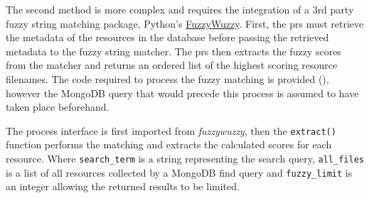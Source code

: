 The second method is more complex and requires the integration of a 3rd party fuzzy string matching package, Python's \href{https://pypi.org/project/fuzzywuzzy/}{FuzzyWuzzy}. First, the \acrshort{prs} must retrieve the metadata of the resources in the database before passing the retrieved metadata to the fuzzy string matcher. The \acrshort{prs} then extracts the fuzzy scores from the matcher and returns an ordered list of the highest scoring resource filenames. The code required to process the fuzzy matching is provided (), however the MongoDB query that would precede this process is assumed to have taken place beforehand.

The process interface is first imported from \textit{fuzzywuzzy}, then the \texttt{extract()} function performs the matching and extracts the calculated scores for each resource. Where \texttt{search\_term} is a string representing the search query, \texttt{all\_files} is a list of all resources collected by a MongoDB find query and \texttt{fuzzy\_limit} is an integer allowing the returned results to be limited.
